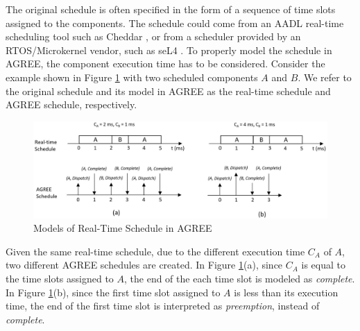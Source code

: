 The original schedule is often specified in the form of a sequence of time slots assigned to the components. 
The schedule could come from an AADL real-time scheduling tool such as Cheddar \cite{cheddar}, or from a scheduler provided by an RTOS/Microkernel vendor, such as seL4 \cite{sel4}. 
To properly model the schedule in AGREE, the component execution time has to be considered. Consider the example shown in Figure \ref{RTschedule} with two scheduled components $A$ and $B$. We refer to the original schedule and its model in AGREE as the real-time schedule and AGREE schedule, respectively.
\begin{figure}[t!]
\centering
\includegraphics[width=\columnwidth]{RTschedule.jpg}
\caption{Models of Real-Time Schedule in AGREE\label{RTschedule}}
\end{figure}
Given the same real-time schedule, due to the different execution time $C_A$ of $A$, two different AGREE schedules are created. In Figure \ref{RTschedule}(a), since $C_A$ is equal to the time slots assigned to $A$, the end of the each time slot is modeled as \emph{complete}. In Figure \ref{RTschedule}(b), since the first time slot assigned to $A$ is less than its execution time, the end of the first time slot is interpreted as \emph{preemption}, instead of \emph{complete}.




